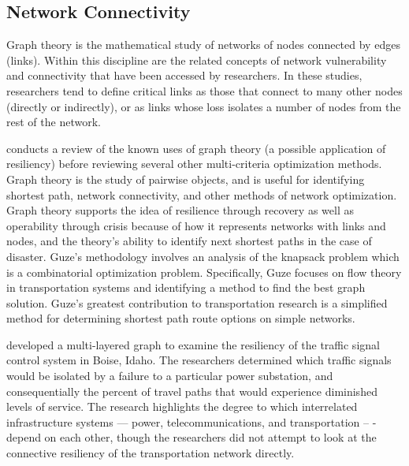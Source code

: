 \subsection{Network Connectivity}

Graph theory is the mathematical study of networks of nodes connected by
edges (links). Within
this discipline are the related concepts of network vulnerability and
connectivity that have been
accessed by researchers. In these studies, researchers tend to define
critical links as those
that connect to many other nodes (directly or indirectly), or as links
whose loss isolates a
number of nodes from the rest of the network.

\citet{guze2014} conducts a review of the known uses of graph theory (a possible application of resiliency) before
reviewing several
other multi-criteria optimization methods.
Graph theory is the study of pairwise objects, and is
useful for identifying
shortest path, network connectivity, and other methods of network
optimization. Graph theory
supports the idea of resilience through recovery as well as operability through crisis
because of how it
represents networks with links and nodes, and the theory's ability to identify next
shortest paths in the
case of disaster. Guze’s methodology
involves an
analysis of the knapsack problem which is a combinatorial optimization problem. Specifically, Guze focuses on flow
theory in transportation
systems and identifying a method to find the best graph solution. Guze’s greatest contribution to transportation research
is a simplified method
for determining shortest path route options on simple networks.

\citet{abdel2007} developed a multi-layered graph to examine the resiliency
of the traffic
signal control system in Boise, Idaho. The researchers determined which
traffic signals would be isolated by a failure to a particular power
substation,
and consequentially the percent of travel paths that would experience
diminished
levels of service. The research highlights the degree to which interrelated
infrastructure systems --- power, telecommunications, and transportation --
-
depend on each other, though the researchers did not attempt to look at the
connective resiliency of the transportation network directly.

